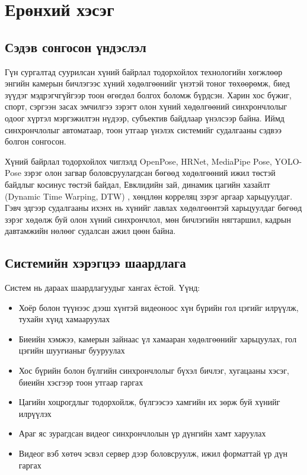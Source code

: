 \chapter{Ерөнхий хэсэг}
\section{Сэдэв сонгосон үндэслэл}

Гүн сургалтад суурилсан хүний байрлал тодорхойлох технологийн хөгжлөөр энгийн камерын бичлэгээс хүний хөдөлгөөнийг үнэтэй тоног төхөөрөмж, биед зүүдэг мэдрэгчгүйгээр тоон өгөгдөл болгох боломж бүрдсэн. Харин хос бүжиг, спорт, сэргээн засах эмчилгээ зэрэгт олон хүний хөдөлгөөний синхрончлолыг одоог хүртэл мэргэжилтэн нүдээр, субъектив байдлаар үнэлсээр байна. Иймд синхрончлолыг автоматаар, тоон утгаар үнэлэх системийг судалгааны сэдвээ болгон сонгосон.

Хүний байрлал тодорхойлох чиглэлд OpenPose, HRNet, MediaPipe Pose, YOLO-Pose зэрэг олон загвар боловсруулагдсан бөгөөд хөдөлгөөний ижил төстэй байдлыг косинус төстэй байдал, Евклидийн зай, динамик цагийн хазайлт (Dynamic Time Warping, DTW) \cite{sakoe1978}, хөндлөн корреляц зэрэг аргаар харьцуулдаг. Гэвч эдгээр судалгааны ихэнх нь хүнийг лавлах хөдөлгөөнтэй харьцуулдаг бөгөөд зэрэг хөдөлж буй олон хүний синхрончлол, мөн бичлэгийн нягтаршил, кадрын давтамжийн нөлөөг судалсан ажил цөөн байна.

\section{Системийн хэрэгцээ шаардлага}

Систем нь дараах шаардлагуудыг хангах ёстой. Үүнд:

\begin{itemize}
\item
  Хоёр болон түүнээс дээш хүнтэй видеоноос хүн бүрийн гол цэгийг илрүүлж, тухайн хүнд хамааруулах
\item
  Биеийн хэмжээ, камерын зайнаас үл хамааран хөдөлгөөнийг харьцуулах, гол цэгийн шуугианыг бууруулах
\item
  Хос бүрийн болон бүлгийн синхрончлолыг бүхэл бичлэг, хугацааны хэсэг, биеийн хэсгээр тоон утгаар гаргах
\item
  Цагийн хоцрогдлыг тодорхойлж, бүлгээсээ хамгийн их зөрж буй хүнийг илрүүлэх
\item
  Араг яс зурагдсан видеог синхрончлолын үр дүнгийн хамт харуулах
\item
  Видеог вэб хөтөч эсвэл сервер дээр боловсруулж, ижил форматтай үр дүн гаргах
\end{itemize}

